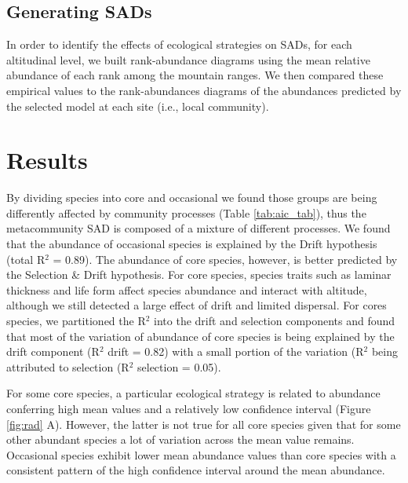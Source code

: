 \documentclass[12pt]{article}
\begin{document}
\subsection*{Generating SADs}

In order to identify the effects of ecological strategies on SADs, for each altitudinal level, we built rank-abundance diagrams using the mean relative abundance of each rank among the mountain ranges. We then compared these empirical
values to the rank-abundances diagrams of the abundances predicted by the selected model at each site (i.e., local community). 

\section*{Results}


By dividing species into core and occasional we found those groups are being differently affected by community processes (Table \ref{tab:aic_tab}), thus the metacommunity SAD is composed of a mixture of different processes. We found that the abundance of occasional species is explained by the Drift hypothesis (total R$^2$ = 0.89). The abundance of core species, however, is better predicted by the Selection \& Drift hypothesis. For core species, species traits such as laminar thickness and life form affect species abundance and interact with altitude, although we still detected a large effect of drift and limited dispersal. For cores species, we partitioned the R$^2$ into the drift and selection components and found that most of the variation of abundance of core species is being explained by the drift component (R$^2$ drift = 0.82) with a small portion of the variation (R{$^2$} being attributed to selection (R$^2$ selection = 0.05). 

For some core species, a particular ecological strategy is related to abundance conferring high mean values and a relatively low confidence interval (Figure \ref{fig:rad} A). However, the latter is not true for all core species given that for some other abundant species a lot of variation across the mean value remains. Occasional species exhibit lower mean abundance values than core species with a consistent pattern of the high confidence interval around the mean abundance. 
\end{document}
